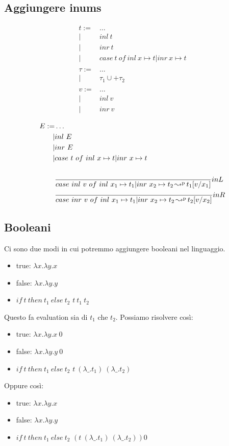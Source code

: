 \documentclass{article}
\begin{document}
\subsection{Aggiungere inums}
\begin{align*}
    t := &\dots \\
    |&inl\ t \\
    |&inr\ t \\
    |&case\ t\ of\ inl\ x\mapsto t | inr\ x\mapsto t \\
    \\
    \tau:= &\dots \\
    |&\tau_1 \cup+ \tau_2 \\
    \\
    v:=&\dots \\
    |&inl\ v \\
    |&inr\ v \\
\end{align*}
\begin{align*}
    E := &\dots \\
    |&inl\ E \\
    |&inr\ E \\
    |&case\ t\ of\ inl\ x\mapsto t| inr\ x\mapsto t \\
    \\
     & \frac{}{case\ inl\ v\ of\ inl\ x_1\mapsto t_1| inr\ x_2\mapsto t_2\credp t_1[v/x_1]}inL \\
     & \frac{}{case\ inr\ v\ of\ inl\ x_1\mapsto t_1| inr\ x_2\mapsto t_2\credp t_2[v/x_2]}inR
\end{align*}

\subsection{Booleani}
Ci sono due modi in cui potremmo aggiungere booleani nel linguaggio.
\begin{itemize}
    \item true: $\lambda x.\lambda y. x$
    \item false: $\lambda x.\lambda y. y$
    \item $if\ t\ then\ t_1\ else\ t_2$ $t\ t_1\ t_2$
\end{itemize}
Questo fa evaluation sia di $t_1$ che $t_2$. Possiamo risolvere così:
\begin{itemize}
    \item true: $\lambda x.\lambda y. x\ 0$
    \item false: $\lambda x.\lambda y. y\ 0$
    \item $if\ t\ then\ t_1\ else\ t_2$ $t\ (\lambda \_.t_1)\ (\lambda\_.t_2)$
\end{itemize}
Oppure così:
\begin{itemize}
    \item true: $\lambda x.\lambda y. x$
    \item false: $\lambda x.\lambda y. y$
    \item $if\ t\ then\ t_1\ else\ t_2$ $(t\ (\lambda \_.t_1)\ (\lambda\_.t_2))0$
\end{itemize}
\end{document}
